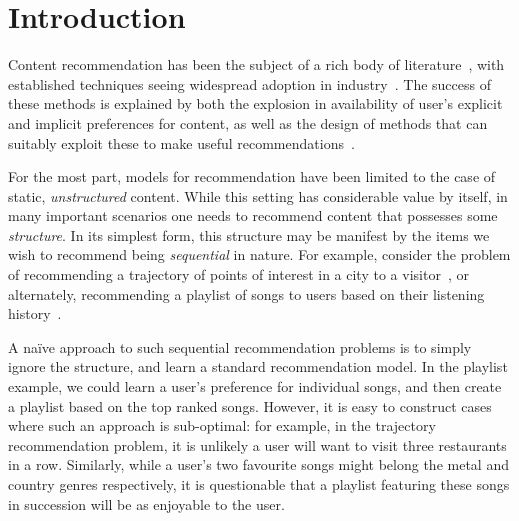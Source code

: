 
\secmoveup
\section{Introduction}
\label{sec:intro}
\textmoveup

Content recommendation has been the subject of a rich body of literature~\citep{Goldberg:1992,Sarwar:2001,Koren:2010},
with established techniques seeing widespread adoption in industry~\citep{Linden:2003,Agarwal:2013,Amatriain:2015,Gomez-Uribe:2015}.
The success of these methods is explained by both the explosion in availability of user's explicit and implicit preferences for content,
as well as the design of methods that can suitably exploit these to make useful recommendations~\citep{Koren:2009}.

For the most part, models for recommendation have been limited to the case of static, \emph{unstructured} content.
While this setting has considerable value by itself,
in many important scenarios one needs to recommend content that possesses some \emph{structure}.
In its simplest form, this structure may be manifest by the items we wish to recommend being \emph{sequential} in nature.
For example, consider the problem of
recommending a trajectory of points of interest in a city to a visitor~\citep{lu2010photo2trip,lu2012personalized,ijcai15,cikm16paper},
or alternately,
recommending a playlist of songs to users based on their listening history~\citep{McFee:2011,chen2012playlist}.

A na\"{i}ve approach to such sequential recommendation problems is to simply ignore the structure,
and learn a standard recommendation model.
In the playlist example, we could learn a user's preference for individual songs,
and then create a playlist based on the top ranked songs.
However, it is easy to construct cases where such an approach is sub-optimal:
for example,
in the trajectory recommendation problem, it is unlikely a user will want to visit three restaurants in a row.
Similarly, 
while a user's two favourite songs might belong
the metal and country genres respectively,
it is questionable that a playlist featuring these songs in succession will be as enjoyable to the user.

